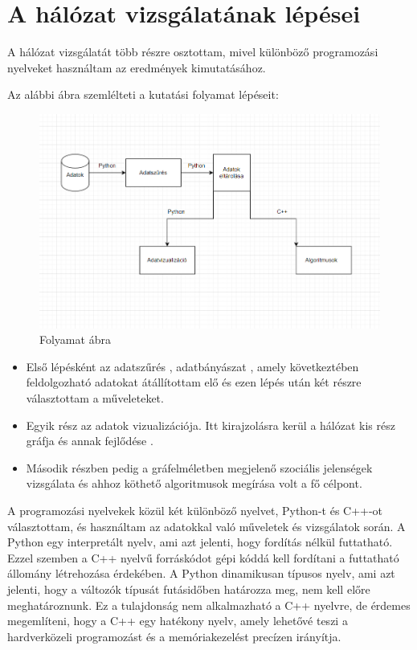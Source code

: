 \chapter{A hálózat vizsgálatának lépései}
A hálózat vizsgálatát több részre osztottam, mivel különböző programozási nyelveket használtam az eredmények kimutatásához.

Az alábbi ábra szemlélteti a kutatási folyamat lépéseit:


\begin{figure}[h]
	\centering
	\includegraphics[scale=0.7]{images/lepesek}
	\caption{Folyamat ábra}
\end{figure}
\begin{itemize}
    \item Első lépésként az adatszűrés , adatbányászat , amely következtében feldolgozható adatokat átállítottam elő és ezen lépés után két részre választottam a műveleteket.
    \item  Egyik rész az adatok vizualizációja. Itt kirajzolásra kerül a hálózat kis rész gráfja és annak fejlődése .
    \item Második részben pedig a gráfelméletben megjelenő szociális jelenségek vizsgálata és ahhoz köthető algoritmusok megírása volt a fő célpont.
\end{itemize}
 
A programozási nyelvekek közül két különböző nyelvet, Python-t és C++-ot választottam, és használtam az adatokkal való műveletek és vizsgálatok során. A Python egy interpretált nyelv, ami azt jelenti, hogy fordítás nélkül futtatható. Ezzel szemben a C++ nyelvű forráskódot gépi kóddá kell fordítani a futtatható állomány létrehozása érdekében. A Python dinamikusan típusos nyelv, ami azt jelenti, hogy a változók típusát futásidőben határozza meg, nem kell előre meghatároznunk. Ez a tulajdonság nem alkalmazható a C++ nyelvre, de érdemes megemlíteni, hogy a C++ egy hatékony nyelv, amely lehetővé teszi a hardverközeli programozást és a memóriakezelést precízen irányítja.

